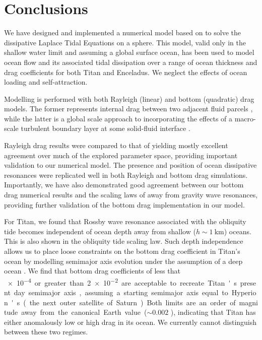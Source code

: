 \section{Conclusions}

We have designed and implemented a numerical model based on \citet{sears1995tidal} to solve the dissipative Laplace Tidal Equations on a sphere. This model, valid only in the shallow water limit and assuming a global surface ocean, has been used to model ocean flow and its associated tidal dissipation over a range of ocean thickness and drag coefficients for both Titan and Enceladus. We neglect the effects of ocean loading and self-attraction.

Modelling is performed with both Rayleigh (linear) and bottom (quadratic) drag models. The former represents internal drag between two adjacent fluid parcels \citep{neumann1968ocean}, while the latter is a global scale approach to incorporating the effects of a macro-scale turbulent boundary layer at some solid-fluid interface \citep{gill1982atmosphere}.

Rayleigh drag results were compared to that of \citet{matsuyama2014tidal} yielding mostly excellent agreement over much of the explored parameter space, providing important validation to our numerical model. The presence and position of ocean dissipative resonances were replicated well in both Rayleigh and bottom drag simulations. Importantly, we have also demonstrated good agreement between our bottom drag numerical results and the scaling laws of \citet{chen2013tidal} away from gravity wave resonances, providing further validation of the bottom drag implementation in our model.

For Titan, we found that Rossby wave resonance associated with the obliquity tide becomes independent of ocean depth away from shallow ($h \sim\SI{1}{\kilo\metre}$) oceans. This is also shown in the \citet{chen2013tidal} obliquity tide scaling law. Such depth independence allows us to place loose constraints on the bottom drag coefficient in Titan's ocean by modelling semimajor axis evolution under the assumption of a deep ocean \citep{sohl2014structural,baland2014titan}. We find that bottom drag coefficients of less that \SI{e-4} or greater than \SI{2e-2} are acceptable to recreate Titan's present day semimajor axis, assuming a starting semimajor axis equal to Hyperion's (the next outer satellite of Saturn). Both limits are an order of magnitude away from the canonical Earth value ($\sim 0.002$ \citep{egbert2001estimates}), indicating that Titan has either anomalously low or high drag in its ocean. We currently cannot distinguish between these two regimes. 

